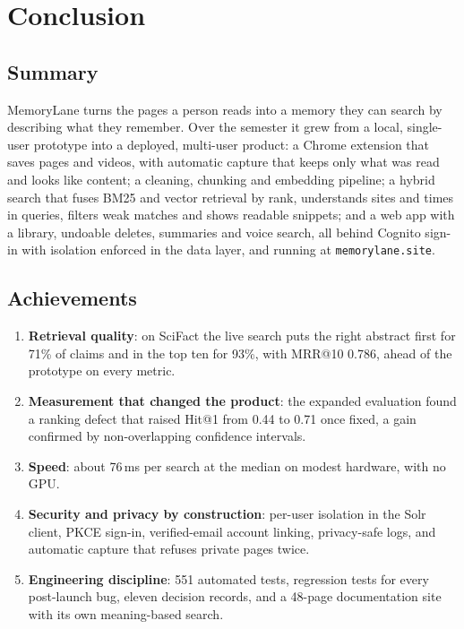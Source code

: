 
\chapter{Conclusion}
\label{ch:conclusion}

\section{Summary}

MemoryLane turns the pages a person reads into a memory they can search by
describing what they remember. Over the semester it grew from a local,
single-user prototype into a deployed, multi-user product: a Chrome extension
that saves pages and videos, with automatic capture that keeps only what was
read and looks like content; a cleaning, chunking and embedding pipeline; a
hybrid search that fuses BM25 and vector retrieval by rank, understands sites
and times in queries, filters weak matches and shows readable snippets; and a
web app with a library, undoable deletes, summaries and voice search, all
behind Cognito sign-in with isolation enforced in the data layer, and running
at \texttt{memorylane.site}.

\section{Achievements}

\begin{enumerate}
  \item \textbf{Retrieval quality}: on SciFact the live search puts the right
  abstract first for 71\% of claims and in the top ten for 93\%, with MRR@10
  0.786, ahead of the prototype on every metric.
  \item \textbf{Measurement that changed the product}: the expanded
  evaluation found a ranking defect that raised Hit@1 from 0.44 to 0.71 once
  fixed, a gain confirmed by non-overlapping confidence intervals.
  \item \textbf{Speed}: about 76\,ms per search at the median on modest
  hardware, with no GPU.
  \item \textbf{Security and privacy by construction}: per-user isolation in
  the Solr client, PKCE sign-in, verified-email account linking, privacy-safe
  logs, and automatic capture that refuses private pages twice.
  \item \textbf{Engineering discipline}: 551 automated tests, regression
  tests for every post-launch bug, eleven decision records, and a 48-page
  documentation site with its own meaning-based search.
\end{enumerate}

